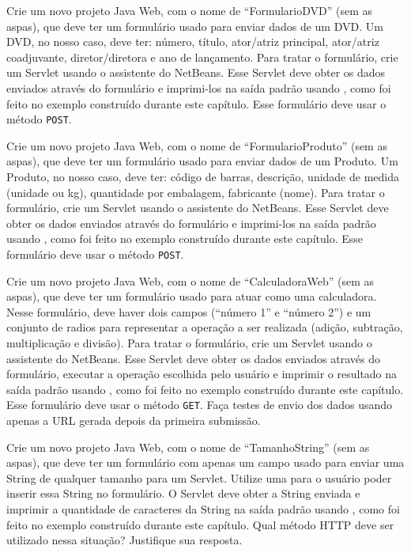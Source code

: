 \begin{projetoSemArquivo}{}{}{}
    Crie um novo projeto Java Web, com o nome de ``FormularioDVD'' (sem as aspas), que deve ter um formulário usado para enviar dados de um DVD. Um DVD, no nosso caso, deve ter: número, título, ator/atriz principal, ator/atriz coadjuvante, diretor/diretora e ano de lançamento. Para tratar o formulário, crie um Servlet usando o assistente do NetBeans. Esse Servlet deve obter os dados enviados através do formulário e imprimi-los na saída padrão usando , como foi feito no exemplo construído durante este capítulo. Esse formulário deve usar o método \texttt{POST}.
\end{projetoSemArquivo}

\begin{projetoSemArquivo}{}{}{}
    Crie um novo projeto Java Web, com o nome de ``FormularioProduto'' (sem as aspas), que deve ter um formulário usado para enviar dados de um Produto. Um Produto, no nosso caso, deve ter: código de barras, descrição, unidade de medida (unidade ou kg), quantidade por embalagem, fabricante (nome). Para tratar o formulário, crie um Servlet usando o assistente do NetBeans. Esse Servlet deve obter os dados enviados através do formulário e imprimi-los na saída padrão usando , como foi feito no exemplo construído durante este capítulo. Esse formulário deve usar o método \texttt{POST}.
\end{projetoSemArquivo}

\begin{projetoSemArquivo}{}{}{}
    Crie um novo projeto Java Web, com o nome de ``CalculadoraWeb'' (sem as aspas), que deve ter um formulário usado para atuar como uma calculadora. Nesse formulário, deve haver dois campos (``número 1'' e ``número 2'') e um conjunto de radios para representar a operação a ser realizada (adição, subtração, multiplicação e divisão). Para tratar o formulário, crie um Servlet usando o assistente do NetBeans. Esse Servlet deve obter os dados enviados através do formulário, executar a operação escolhida pelo usuário e imprimir o resultado na saída padrão usando , como foi feito no exemplo construído durante este capítulo. Esse formulário deve usar o método \texttt{GET}. Faça testes de envio dos dados usando apenas a URL gerada depois da primeira submissão.
\end{projetoSemArquivo}

\begin{projetoSemArquivo}{}{}{}
    Crie um novo projeto Java Web, com o nome de ``TamanhoString'' (sem as aspas), que deve ter um formulário com apenas um campo usado para enviar uma String de qualquer tamanho para um Servlet. Utilize uma  para o usuário poder inserir essa String no formulário. O Servlet deve obter a String enviada e imprimir a quantidade de caracteres da String na saída padrão usando , como foi feito no exemplo construído durante este capítulo. Qual método HTTP deve ser utilizado nessa situação? Justifique sua resposta.
\end{projetoSemArquivo}

